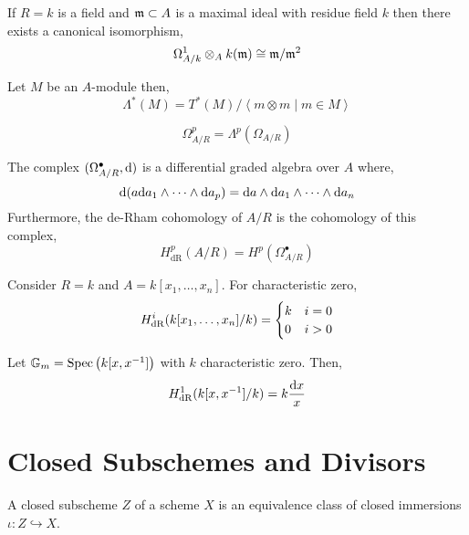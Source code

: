 \documentclass[12pt]{article}
\begin{document}
\begin{remark}
If $R = k$ is a field and $\mathfrak{m} \subset A$ is a maximal ideal with residue field $k$ then there exists a canonical isomorphism,
\[ \Omega^1_{A /k } \otimes_A k(\mathfrak{m}) \cong \mathfrak{m} / \mathfrak{m}^2 \]  
\end{remark}

\begin{definition}
Let $M$ be an $A$-module then,
\[ \Lambda^*(M) = T^*(M)/ \left< m \otimes m \mid m \in M \right> \]
\end{definition}

\begin{definition}
\[ \Omega^p_{A/R} = \Lambda^p (\Omega_{A / R}) \]
\end{definition}


\begin{theorem}
The complex $(\Omega^\bullet_{A / R}, \mathrm{d}{})$ is a differential graded algebra over $A$ where,
\[ \mathrm{d}{ (a \mathrm{d}{a_1} \wedge \cdots \wedge \mathrm{d}{a_p})} = \mathrm{d}{a} \wedge \mathrm{d}{a_1} \wedge \cdots \wedge \mathrm{d}{a_n} \]
Furthermore, the de-Rham cohomology of $A/R$ is the cohomology of this complex,
\[ H^p_{\text{dR}}(A/R) = H^p(\Omega^\bullet_{A/R}) \]
\end{theorem}

\begin{example}
Consider $R = k$ and $A = k[x_1, \dots, x_n]$. For characteristic zero,
\[ H^i_{\mathrm{dR}}(k[x_1, \dots, x_n] / k) = 
\begin{cases}
k & i = 0
\\
0 & i > 0
\end{cases} \] 
\end{example}


\begin{example}
Let $\mathbb{G}_m = \mathrm{Spec}\left( k[x, x^{-1}] \right)$ with $k$ characteristic zero. Then,
\[ H^1_{\mathrm{dR}}(k[x, x^{-1}] / k) = k \frac{\mathrm{d}{x}}{x} \]
\end{example}


\section{Closed Subschemes and Divisors}

\begin{definition}
A closed subscheme $Z$ of a scheme $X$ is an equivalence class of closed immersions $\iota : Z \hookrightarrow X$. 
\end{definition}
\end{document}
